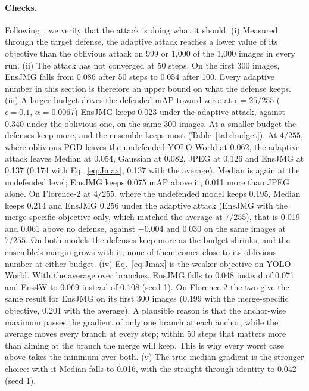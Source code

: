 \documentclass[11pt]{article}
\newcommand{\yw}{YOLO-World}
\newcommand{\fl}{Florence-2}
\begin{document}
\paragraph{Checks.} Following~\cite{carlini2019evaluating}, we verify that
the attack is doing what it should.
(i) Measured through the target defense, the adaptive attack reaches a lower
value of its objective than the oblivious attack on 999 or 1{,}000 of the
1{,}000 images in every run.
(ii) The attack has not converged at 50 steps. On the first 300 images,
EnsJMG falls from 0.086 after 50 steps to 0.054 after 100. Every adaptive
number in this section is therefore an upper bound on what the defense
keeps.
(iii) A larger budget drives the defended mAP toward zero: at
$\epsilon=25/255$ ($\epsilon=0.1$, $\alpha=0.0067$) EnsJMG keeps 0.023 under
the adaptive attack, against 0.340 under the oblivious one, on the same 300
images. At a smaller budget the defenses keep more, and the ensemble keeps
most (Table~\ref{tab:budget}). At $4/255$, where oblivious PGD leaves the
undefended \yw{} at 0.062, the adaptive attack leaves Median at 0.054,
Gaussian at 0.082, JPEG at 0.126 and EnsJMG at 0.137 (0.174 with
Eq.~\ref{eq:Jmax}, 0.137 with the average). Median is again at the
undefended level; EnsJMG keeps 0.075 mAP above it, 0.011 more than JPEG
alone. On \fl{} at $4/255$, where the undefended model keeps 0.195, Median
keeps 0.214 and EnsJMG 0.256 under the adaptive attack (EnsJMG with the
merge-specific objective only, which matched the average at $7/255$), that
is 0.019 and 0.061 above no defense, against $-0.004$ and 0.030 on the same
images at $7/255$. On both models the defenses keep more as the budget
shrinks, and the ensemble's margin grows with it; none of them comes close
to its oblivious number at either budget.
(iv) Eq.~\ref{eq:Jmax} is the weaker objective on \yw{}. With the average
over branches, EnsJMG falls to 0.048 instead of 0.071 and Ens4W to 0.069
instead of 0.108 (seed 1). On \fl{} the two give the same result for EnsJMG
on its first 300 images (0.199 with the merge-specific objective, 0.201 with
the average). A plausible reason is that the anchor-wise maximum passes the
gradient of only one branch at each anchor, while the average moves every
branch at every step; within 50 steps that matters more than aiming at the
branch the merge will keep. This is why every worst case above takes the
minimum over both.
(v) The true median gradient is the stronger choice: with it Median falls to
0.016, with the straight-through identity to 0.042 (seed 1).
\end{document}
